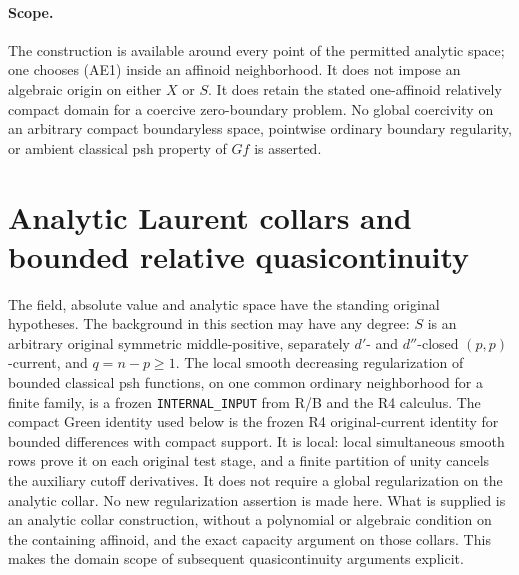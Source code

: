 \documentclass[11pt,a4paper]{article}
\numberwithin{equation}{section}
\theoremstyle{definition}
\theoremstyle{remark}
\begin{document}
\paragraph{Scope.}
The construction is available around every point of the permitted
analytic space; one chooses (AE1) inside an affinoid neighborhood.
It does not impose an algebraic origin on either $X$ or $S$.
It does retain the stated one-affinoid relatively compact domain
for a coercive zero-boundary problem.  No global coercivity on an
arbitrary compact boundaryless space, pointwise ordinary boundary
regularity, or ambient classical psh property of $Gf$ is asserted.



\section{Analytic Laurent collars and bounded relative quasicontinuity}
\label{sec:r11-analytic-Laurent-collars}

The field, absolute value and analytic space have the standing original
hypotheses.  The background in this section may have any degree:
$S$ is an arbitrary original symmetric middle-positive, separately
$d'$- and $d''$-closed $(p,p)$-current, and $q=n-p\geq1$.
The local smooth decreasing regularization of bounded classical psh
functions, on one common ordinary neighborhood for a finite family,
is a frozen \texttt{INTERNAL\_INPUT} from R/B and the R4 calculus.
The compact Green identity used below is the frozen R4 original-current
identity for bounded differences with compact support.  It is local:
local simultaneous smooth rows prove it on each original test stage,
and a finite partition of unity cancels the auxiliary cutoff derivatives.
It does not require a global regularization on the analytic collar.
No new regularization assertion is made here.  What is supplied is an
analytic collar construction, without a polynomial or algebraic
condition on the containing affinoid, and the exact capacity argument
on those collars.  This makes the domain scope of subsequent
quasicontinuity arguments explicit.
\end{document}
